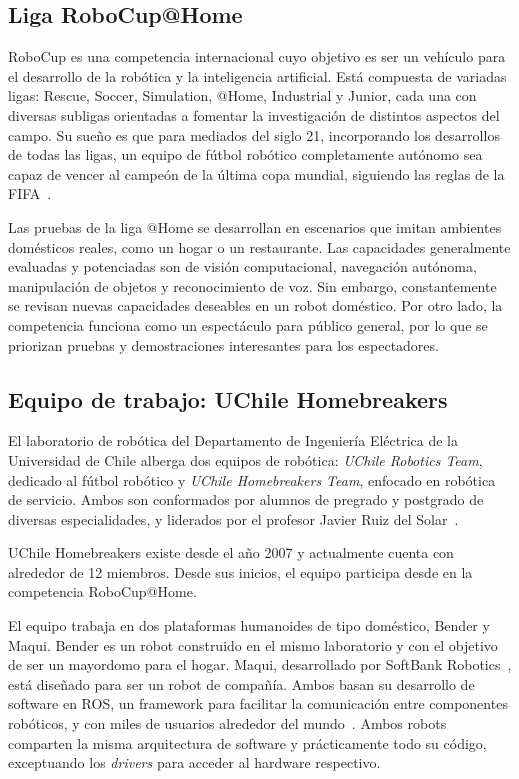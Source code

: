 \subsection{Liga RoboCup@Home}

RoboCup es una competencia internacional cuyo objetivo es ser un vehículo para el desarrollo de la robótica y la inteligencia artificial. Está compuesta de variadas ligas: Rescue, Soccer, Simulation, @Home, Industrial y Junior, cada una con diversas subligas orientadas a fomentar la investigación de distintos aspectos del campo. Su sueño es que para mediados del siglo 21, incorporando los desarrollos de todas las ligas, un equipo de fútbol robótico completamente autónomo sea capaz de vencer al campeón de la última copa mundial, siguiendo las reglas de la FIFA~\cite{robocup:rulebook_2018}.

Las pruebas de la liga @Home se desarrollan en escenarios que imitan ambientes domésticos reales, como un hogar o un restaurante. Las capacidades generalmente evaluadas y potenciadas son de visión computacional, navegación autónoma, manipulación de objetos y reconocimiento de voz. Sin embargo, constantemente se revisan nuevas capacidades deseables en un robot doméstico. Por otro lado, la competencia funciona como un espectáculo para público general, por lo que se priorizan pruebas y demostraciones interesantes para los espectadores.

\subsection{Equipo de trabajo: UChile Homebreakers}

El laboratorio de robótica del Departamento de Ingeniería Eléctrica de la Universidad de Chile alberga dos equipos de robótica: \textit{UChile Robotics Team}, dedicado al fútbol robótico y \textit{UChile Homebreakers Team}, enfocado en robótica de servicio. Ambos son conformados por alumnos de pregrado y postgrado de diversas especialidades, y liderados por el profesor Javier Ruiz del Solar~\cite{uchile-robotics}.

UChile Homebreakers existe desde el año 2007 y actualmente cuenta con alrededor de 12 miembros. Desde sus inicios, el equipo participa desde en la competencia RoboCup@Home.

El equipo trabaja en dos plataformas humanoides de tipo doméstico, Bender y Maqui. Bender es un robot construido en el mismo laboratorio y con el objetivo de ser un mayordomo para el hogar. Maqui, desarrollado por SoftBank Robotics~\cite{softbank}, está diseñado para ser un robot de compañía. Ambos basan su desarrollo de software en ROS, un framework para facilitar la comunicación entre componentes robóticos, y con miles de usuarios alrededor del mundo~\cite{ROS:2009}. Ambos robots comparten la misma arquitectura de software y prácticamente todo su código, exceptuando los \textit{drivers} para acceder al hardware respectivo. 



